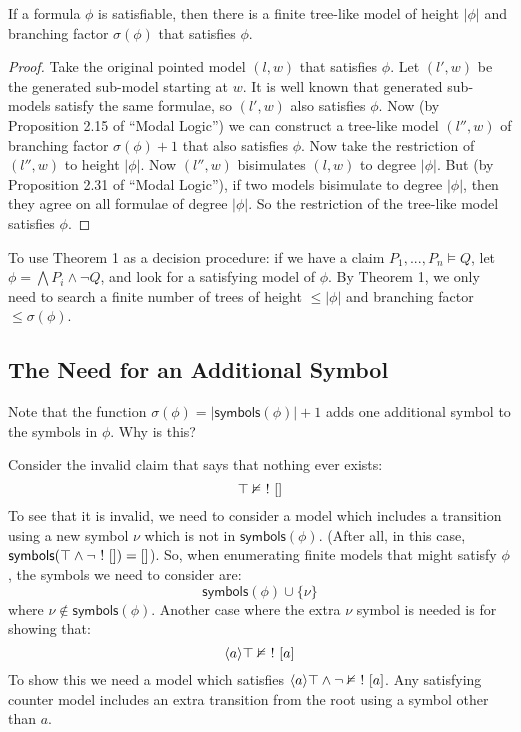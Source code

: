 \begin{theorem}
If a formula $\phi$ is satisfiable, then there is a finite tree-like model of height $|\phi|$ and branching factor $\sigma(\phi)$ that satisfies $\phi$.
\end{theorem}
\begin{proof}
Take the original pointed model $(l,w)$ that satisfies $\phi$.
Let $(l',w)$ be the generated sub-model starting at $w$. 
It is well known that generated sub-models satisfy the same formulae, so $(l',w)$ also satisfies $\phi$.
Now (by Proposition 2.15 of ``Modal Logic'') we can construct a tree-like model $(l'',w)$ of branching factor $\sigma(\phi)+1$ that also satisfies $\phi$.
Now take the restriction of $(l'',w)$ to height $|\phi|$.
Now $(l'',w)$ bisimulates $(l,w)$ to degree $|\phi|$.
But (by Proposition 2.31 of ``Modal Logic''), if two models bisimulate to degree $|\phi|$, then they agree on all formulae of degree $|\phi|$. So the restriction of the tree-like model satisfies $\phi$.
\end{proof}

To use Theorem 1 as a decision procedure: if we have a claim $P_1, ..., P_n \models Q$,  let $ \phi = \bigwedge P_i \land \neg Q$, and look for a satisfying model of $\phi$. By Theorem 1, we only need to search a finite number of trees of height $\leq |\phi|$ and branching factor $\leq \sigma(\phi)$.

\subsection{The Need for an Additional Symbol}
Note that the function $\sigma(\phi) = |\mathsf{symbols}(\phi)| + 1$ adds one additional symbol to the symbols in $\phi$. Why is this?

Consider the invalid claim that says that nothing ever exists:
\[
\top \nvDash \ ! \  []
\]
To see that it is invalid, we need to consider a model which includes a transition using a new symbol $\nu$ which is not in $\mathsf{symbols}(\phi)$. (After all, in this case, $\mathsf{symbols}(\top \land \neg  \ ! \  []) = []$). 
So, when enumerating finite models that might satisfy $\phi$, the symbols we need to consider are:
\[
\mathsf{symbols}(\phi) \cup \{\nu\}
\]
where $\nu \notin \mathsf{symbols}(\phi)$. Another case where the extra $\nu$ symbol is needed is for showing that:
\[
\langle a \rangle \top \nvDash \ ! \  [a]
\]
To show this we need a model which satisfies $\langle a \rangle \top \land \neg \nvDash \ ! \  [a]$.
Any satisfying counter model includes an extra transition from the root using a symbol other than $a$.


